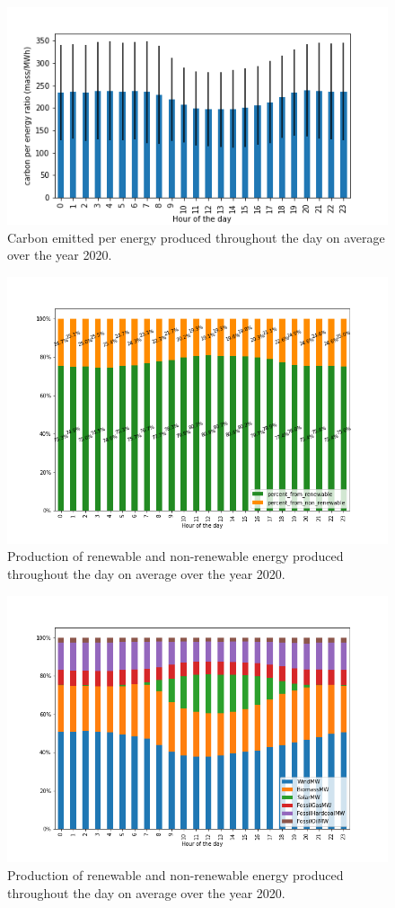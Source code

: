 \documentclass[11pt]{article} %
\begin{document}
\begin{figure}[h!]
  \includegraphics[width=0.8\linewidth]{../outputs/carbon_per_energy_ratio.png}
  \caption{Carbon emitted per energy produced throughout the day on average over the year 2020.}
  \label{fig:co2_kwh}
\end{figure}
 
\begin{figure}[h!]
  \includegraphics[width=1\linewidth]{../outputs/generated_energy_green_percent.png}
  \caption{Production of renewable and non-renewable energy produced throughout the day on average over the year 2020.}
  \label{fig:per_green}
\end{figure}

\begin{figure}[h!]
  \includegraphics[width=0.9\linewidth]{../outputs/generated_energy_precent_per_sources.png}
  \caption{Production of renewable and non-renewable energy produced throughout the day on average over the year 2020.}
  \label{fig:per_source}
\end{figure}
\end{document}
